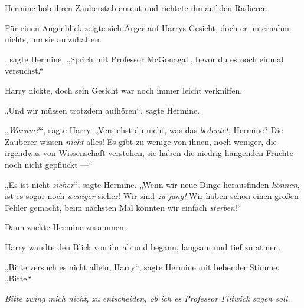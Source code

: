 Hermine hob ihren Zauberstab erneut und richtete ihn auf den Radierer.

Für einen Augenblick zeigte sich Ärger auf Harrys Gesicht, doch er unternahm nichts, um sie aufzuhalten.

, sagte Hermine.
„Sprich mit Professor McGonagall, bevor du es noch einmal versuchst.“

Harry nickte, doch sein Gesicht war noch immer leicht verkniffen.

„Und wir müssen trotzdem aufhören“, sagte Hermine.

„\emph{Warum?}“, sagte Harry.
„Verstehst du nicht, was das \emph{bedeutet}, Hermine? Die Zauberer wissen \emph{nicht} alles! Es gibt zu wenige von ihnen, noch weniger, die irgendwas von Wissenschaft verstehen, sie haben die niedrig hängenden Früchte noch nicht gepflückt —“

„Es ist nicht \emph{sicher}“, sagte Hermine.
„Wenn wir neue Dinge herausfinden \emph{können}, ist es sogar noch \emph{weniger} sicher! Wir sind \emph{zu jung!} Wir haben schon einen großen Fehler gemacht, beim nächsten Mal könnten wir einfach \emph{sterben}!“

Dann zuckte Hermine zusammen.

Harry wandte den Blick von ihr ab und begann, langsam und tief zu atmen.

„Bitte versuch es nicht allein, Harry“, sagte Hermine mit bebender Stimme.
„Bitte.“

\emph{Bitte zwing mich nicht, zu entscheiden, ob ich es Professor Flitwick sagen soll.}

